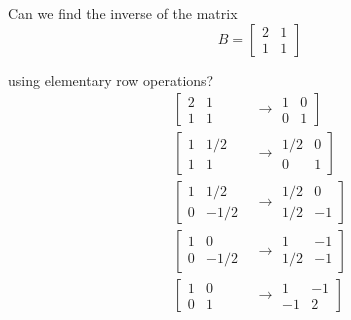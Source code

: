 \documentclass{article}
\begin{document}
\begin{example}
  Can we find the inverse of the matrix
  \[
    B = \left[\begin{matrix}
      2 & 1 \\ 1 & 1
    \end{matrix}\right]
  \]

  using elementary row operations?
  \begin{equation}
    \begin{array}{rl}
      \left[
      \begin{matrix}
        2 & 1 \\
        1 & 1
      \end{matrix}
      \right.
      & \to
      \left.
      \begin{matrix}
        1 & 0 \\
        0 & 1
      \end{matrix}
      \right]
      \\[24pt]
      \left[
      \begin{matrix}
        1 & 1/2 \\
        1 & 1
      \end{matrix}
      \right.
      & \to
      \left.
      \begin{matrix}
        1/2 & 0 \\
        0 & 1
      \end{matrix}
      \right]
      \\[24pt]
      \left[
      \begin{matrix}
        1 & 1/2 \\
        0 & -1/2
      \end{matrix}
      \right.
      & \to
      \left.
      \begin{matrix}
        1/2 & 0 \\
        1/2 & -1
      \end{matrix}
      \right]
      \\[24pt]
      \left[
      \begin{matrix}
        1 & 0 \\
        0 & -1/2
      \end{matrix}
      \right.
      & \to
      \left.
      \begin{matrix}
        1 & -1 \\
        1/2 & -1
      \end{matrix}
      \right]
      \\[24pt]
      \left[
      \begin{matrix}
        1 & 0 \\
        0 & 1
      \end{matrix}
      \right.
      & \to
      \left.
      \begin{matrix}
        1 & -1 \\
        -1 & 2
      \end{matrix}
      \right]
    \end{array}
    \nonumber
  \end{equation}


\end{example}
\end{document}
